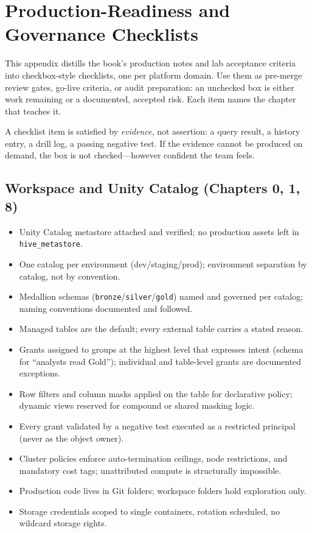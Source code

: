 \chapter{Production-Readiness and Governance Checklists}
%
This appendix distills the book's production notes and lab acceptance criteria into
checkbox-style checklists, one per platform domain. Use them as pre-merge review gates,
go-live criteria, or audit preparation: an unchecked box is either work remaining or a
documented, accepted risk. Each item names the chapter that teaches it.

\begin{notebox}
A checklist item is satisfied by \emph{evidence}, not assertion: a query result, a history
entry, a drill log, a passing negative test. If the evidence cannot be produced on demand,
the box is not checked---however confident the team feels.
\end{notebox}

\section{Workspace and Unity Catalog (Chapters 0, 1, 8)}
%
\begin{itemize}
    \item[$\square$] Unity Catalog metastore attached and verified; no production assets left
    in \texttt{hive\_metastore}.
    \item[$\square$] One catalog per environment (dev/staging/prod); environment separation by
    catalog, not by convention.
    \item[$\square$] Medallion schemas (\texttt{bronze}/\texttt{silver}/\texttt{gold}) named and
    governed per catalog; naming conventions documented and followed.
    \item[$\square$] Managed tables are the default; every external table carries a stated reason.
    \item[$\square$] Grants assigned to groups at the highest level that expresses intent
    (schema for ``analysts read Gold''); individual and table-level grants are documented
    exceptions.
    \item[$\square$] Row filters and column masks applied on the table for declarative policy;
    dynamic views reserved for compound or shared masking logic.
    \item[$\square$] Every grant validated by a negative test executed as a restricted principal
    (never as the object owner).
    \item[$\square$] Cluster policies enforce auto-termination ceilings, node restrictions, and
    mandatory cost tags; unattributed compute is structurally impossible.
    \item[$\square$] Production code lives in Git folders; workspace folders hold exploration only.
    \item[$\square$] Storage credentials scoped to single containers, rotation scheduled, no
    wildcard storage rights.
\end{itemize}

